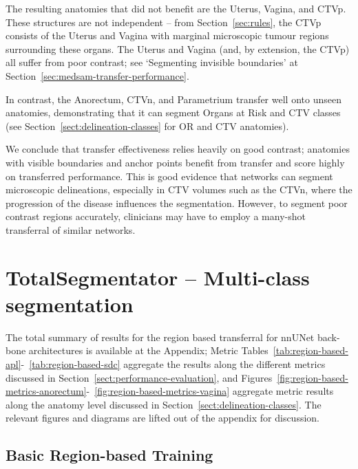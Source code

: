 \documentclass[11pt,twoside]{report}
\begin{document}
The resulting anatomies that did not benefit are the Uterus, Vagina, and CTVp. These structures are not independent -- from Section~\ref{sec:rules}, the CTVp consists of the Uterus and Vagina with marginal microscopic tumour regions surrounding these organs. The Uterus and Vagina (and, by extension, the CTVp) all suffer from poor contrast; see `Segmenting invisible boundaries' at Section~\ref{sec:medsam-transfer-performance}. 

In contrast, the Anorectum, CTVn, and Parametrium transfer well onto unseen anatomies, demonstrating that it can segment Organs at Risk and CTV classes (see Section~\ref{sect:delineation-classes} for OR and CTV anatomies).

We conclude that transfer effectiveness relies heavily on good contrast; anatomies with visible boundaries and anchor points benefit from transfer and score highly on transferred performance. This is good evidence that networks can segment microscopic delineations, especially in CTV volumes such as the CTVn, where the progression of the disease influences the segmentation. However, to segment poor contrast regions accurately, clinicians may have to employ a many-shot transferral of similar networks.

\section{TotalSegmentator -- Multi-class segmentation}

The total summary of results for the region based transferral for nnUNet back-bone architectures is available at the Appendix; Metric Tables~\ref{tab:region-based-apl}-~\ref{tab:region-based-sdc} aggregate the results along the different metrics discussed in Section~\ref{sect:performance-evaluation}, and Figures~\ref{fig:region-based-metrics-anorectum}-~\ref{fig:region-based-metrics-vagina} aggregate metric results along the anatomy level discussed in Section~\ref{sect:delineation-classes}. The relevant figures and diagrams are lifted out of the appendix for discussion.

\subsection{Basic Region-based Training}

\end{document}
